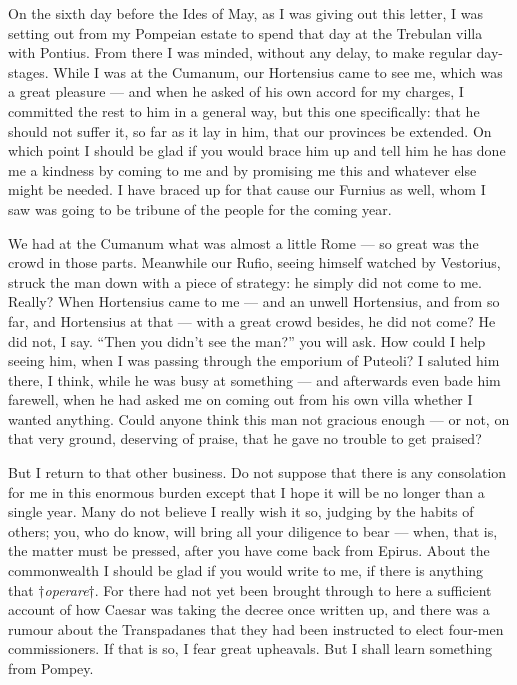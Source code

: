 

 On the sixth day before the Ides of May, as I was giving out this letter, I was setting out from my Pompeian estate to spend that day at the Trebulan villa with Pontius. From there I was minded, without any delay, to make regular day-stages. While I was at the Cumanum, our Hortensius came to see me, which was a great pleasure --- and when he asked of his own accord for my charges, I committed the rest to him in a general way, but this one specifically: that he should not suffer it, so far as it lay in him, that our provinces be extended. On which point I should be glad if you would brace him up and tell him he has done me a kindness by coming to me and by promising me this and whatever else might be needed. I have braced up for that cause our Furnius as well, whom I saw was going to be tribune of the people for the coming year.

 We had at the Cumanum what was almost a little Rome --- so great was the crowd in those parts. Meanwhile our Rufio, seeing himself watched by Vestorius, struck the man down with a piece of strategy: he simply did not come to me. Really? When Hortensius came to me --- and an unwell Hortensius, and from so far, and Hortensius at that --- with a great crowd besides, he did not come? He did not, I say. ``Then you didn't see the man?'' you will ask. How could I help seeing him, when I was passing through the emporium of Puteoli? I saluted him there, I think, while he was busy at something --- and afterwards even bade him farewell, when he had asked me on coming out from his own villa whether I wanted anything. Could anyone think this man not gracious enough --- or not, on that very ground, deserving of praise, that he gave no trouble to get praised?

 But I return to that other business. Do not suppose that there is any consolation for me in this enormous burden except that I hope it will be no longer than a single year. Many do not believe I really wish it so, judging by the habits of others; you, who do know, will bring all your diligence to bear --- when, that is, the matter must be pressed, after you have come back from Epirus. About the commonwealth I should be glad if you would write to me, if there is anything that \textit{$\dagger$operare$\dagger$}. For there had not yet been brought through to here a sufficient account of how Caesar was taking the decree once written up, and there was a rumour about the Transpadanes that they had been instructed to elect four-men commissioners. If that is so, I fear great upheavals. But I shall learn something from Pompey.

